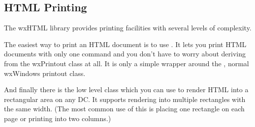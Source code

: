 \subsection{HTML Printing}\label{printing}

The wxHTML library provides printing facilities with several levels of complexity. 

The easiest way to print an HTML document is to use 
. It lets you print HTML documents with only one
command and you don't have to worry about deriving from the wxPrintout class at all. It is only a simple wrapper around the 
, normal wxWindows printout class.

And finally there is the low level class  which you can use to
render HTML into a rectangular area on any DC. It supports rendering into multiple rectangles with the same
width. (The most common use of this is placing one rectangle on each page or printing into two columns.)

